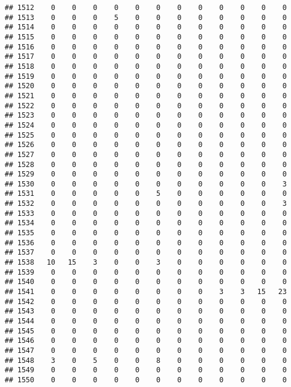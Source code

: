 \documentclass[]{article}
\begin{document}
\begin{verbatim}
## 1512    0    0    0    0    0    0    0    0    0    0    0    0
## 1513    0    0    0    5    0    0    0    0    0    0    0    0
## 1514    0    0    0    0    0    0    0    0    0    0    0    0
## 1515    0    0    0    0    0    0    0    0    0    0    0    0
## 1516    0    0    0    0    0    0    0    0    0    0    0    0
## 1517    0    0    0    0    0    0    0    0    0    0    0    0
## 1518    0    0    0    0    0    0    0    0    0    0    0    0
## 1519    0    0    0    0    0    0    0    0    0    0    0    0
## 1520    0    0    0    0    0    0    0    0    0    0    0    0
## 1521    0    0    0    0    0    0    0    0    0    0    0    0
## 1522    0    0    0    0    0    0    0    0    0    0    0    0
## 1523    0    0    0    0    0    0    0    0    0    0    0    0
## 1524    0    0    0    0    0    0    0    0    0    0    0    0
## 1525    0    0    0    0    0    0    0    0    0    0    0    0
## 1526    0    0    0    0    0    0    0    0    0    0    0    0
## 1527    0    0    0    0    0    0    0    0    0    0    0    0
## 1528    0    0    0    0    0    0    0    0    0    0    0    0
## 1529    0    0    0    0    0    0    0    0    0    0    0    0
## 1530    0    0    0    0    0    0    0    0    0    0    0    3
## 1531    0    0    0    0    0    5    0    0    0    0    0    0
## 1532    0    0    0    0    0    0    0    0    0    0    0    3
## 1533    0    0    0    0    0    0    0    0    0    0    0    0
## 1534    0    0    0    0    0    0    0    0    0    0    0    0
## 1535    0    0    0    0    0    0    0    0    0    0    0    0
## 1536    0    0    0    0    0    0    0    0    0    0    0    0
## 1537    0    0    0    0    0    0    0    0    0    0    0    0
## 1538   10   15    3    0    0    3    0    0    0    0    0    0
## 1539    0    0    0    0    0    0    0    0    0    0    0    0
## 1540    0    0    0    0    0    0    0    0    0    0    0    0
## 1541    0    0    0    0    0    0    0    0    3    3   15   23
## 1542    0    0    0    0    0    0    0    0    0    0    0    0
## 1543    0    0    0    0    0    0    0    0    0    0    0    0
## 1544    0    0    0    0    0    0    0    0    0    0    0    0
## 1545    0    0    0    0    0    0    0    0    0    0    0    0
## 1546    0    0    0    0    0    0    0    0    0    0    0    0
## 1547    0    0    0    0    0    0    0    0    0    0    0    0
## 1548    3    0    5    0    0    8    0    0    0    0    0    0
## 1549    0    0    0    0    0    0    0    0    0    0    0    0
## 1550    0    0    0    0    0    0    0    0    0    0    0    0

\end{verbatim}
\end{document}

